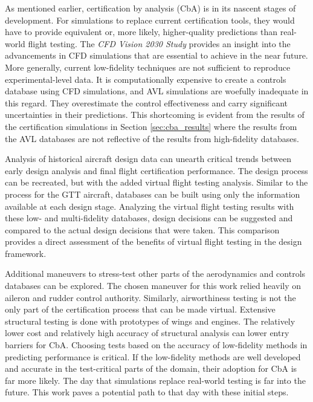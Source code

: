As mentioned earlier, certification by analysis (CbA) is in its nascent stages of development.
For simulations to replace current certification tools, they would have to provide equivalent or, more likely, higher-quality predictions than real-world flight testing. 
The \textit{CFD Vision 2030 Study} \cite{slotnick_cfd_nodate} provides an insight into the advancements in CFD simulations that are essential to achieve in the near future. 
More generally, current low-fidelity techniques are not sufficient to reproduce experimental-level data. 
It is computationally expensive to create a controls database using CFD simulations, and AVL simulations are woefully inadequate in this regard.
They overestimate the control effectiveness and carry significant uncertainties in their predictions.
This shortcoming is evident from the results of the certification simulations in Section \ref{sec:cba_results} where the results from the AVL databases are not reflective of the results from high-fidelity databases. 

Analysis of historical aircraft design data can unearth critical trends between early design analysis and final flight certification performance. 
The design process can be recreated, but with the added virtual flight testing analysis.
Similar to the process for the GTT aircraft, databases can be built using only the information available at each design stage. 
Analyzing the virtual flight testing results with these low- and multi-fidelity databases, design decisions can be suggested and compared to the actual design decisions that were taken. 
This comparison provides a direct assessment of the benefits of virtual flight testing in the design framework. 

Additional maneuvers to stress-test other parts of the aerodynamics and controls databases can be explored.
The chosen maneuver for this work relied heavily on aileron and rudder control authority. 
Similarly, airworthiness testing is not the only part of the certification process that can be made virtual. 
Extensive structural testing is done with prototypes of wings and engines.
The relatively lower cost and relatively high accuracy of structural analysis can lower entry barriers for CbA. 
Choosing tests based on the accuracy of low-fidelity methods in predicting performance is critical. 
If the low-fidelity methods are well developed and accurate in the test-critical parts of the domain, their adoption for CbA is far more likely.
The day that simulations replace real-world testing is far into the future. 
This work paves a potential path to that day with these initial steps.